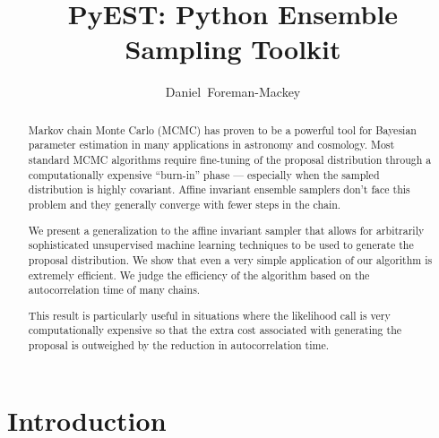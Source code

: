 \documentclass[12pt,preprint]{aastex}
\begin{document}
\title{PyEST: Python Ensemble Sampling Toolkit}
\author{Daniel~Foreman-Mackey}

\begin{abstract}

    Markov chain Monte Carlo (MCMC) has proven to be a powerful tool for Bayesian
    parameter estimation in many applications in astronomy and cosmology.  Most
    standard MCMC algorithms require fine-tuning of the proposal distribution
    through a computationally expensive ``burn-in'' phase --- especially when the
    sampled distribution is highly covariant.
    Affine invariant ensemble samplers don't face this problem and they generally
    converge with fewer steps in the chain.

    We present a generalization to the \citet{Goodman:2010} affine invariant sampler
    that allows for arbitrarily sophisticated unsupervised machine learning techniques
    to be used to generate the proposal distribution.  We show that even a very simple
    application of our algorithm is extremely efficient.  We judge the efficiency
    of the algorithm based on the autocorrelation time of many chains.

    This result is particularly useful in situations where the likelihood call is
    very computationally expensive so that the extra cost associated with generating
    the proposal is outweighed by the reduction in autocorrelation time.

\end{abstract}

\keywords{
}

\section{Introduction}
\end{document}
